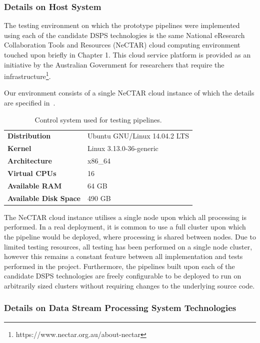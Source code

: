 \subsubsection{Details on Host System} %
\label{ssub:host_system}

The testing environment on which the prototype pipelines were implemented using each of the candidate DSPS technologies
is the same National eResearch Collaboration Tools and Resources (NeCTAR) cloud computing environment touched upon
briefly in Chapter 1. This cloud service platform is provided as an initiative by the Australian Government for researchers
that require the infrastructure\footnote{https://www.nectar.org.au/about-nectar}.

Our environment consists of a single NeCTAR cloud instance of which the details are specified in~.

\begin{table}[h]
\caption{Control system used for testing pipelines.}
\label{tab:control}
\centering
\begin{tabular}{ll}
\textbf{Distribution}         & Ubuntu GNU/Linux 14.04.2 LTS \\
\textbf{Kernel}               & Linux 3.13.0-36-generic    \\
\textbf{Architecture}         & x86\_64                    \\
\textbf{Virtual CPUs}         & 16                         \\
\textbf{Available RAM}        & 64 GB                      \\
\textbf{Available Disk Space} & 490 GB
\end{tabular}
\end{table}

The NeCTAR cloud instance utilises a single node upon which all processing is performed. In a real deployment, it is
common to use a full cluster upon which the pipeline would be deployed, where processing is shared between nodes. Due to
limited testing resources, all testing
has been performed on a single node cluster, however this remains a constant feature between all implementation and tests
performed in the project. Furthermore, the pipelines built upon
each of the candidate DSPS technologies are freely configurable to be deployed to run on arbitrarily sized clusters without
requiring changes to the underlying source code.



\subsubsection{Details on Data Stream Processing System Technologies} %
\label{sub:setting_up_of_dsps_technologies}


